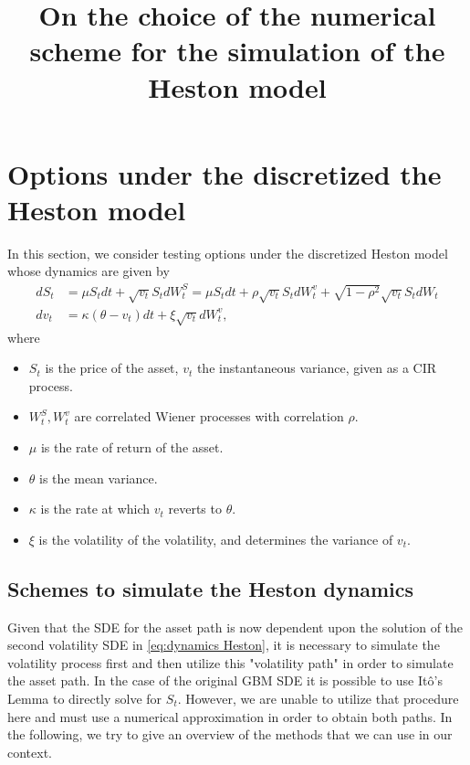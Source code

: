 \documentclass[11pt]{article}
\title{On the choice of the numerical scheme for the simulation of the Heston model}
\date{ }
\newcommand{\COMMA}{,}
\begin{document}
\maketitle






\section{Options under the discretized the Heston model}
In this section, we consider  testing options under the discretized Heston model \cite{heston1993closed,broadie2006exact,kahl2006fast,andersen2007efficient} whose dynamics are given by
\begin{align}\label{eq:dynamics Heston}
dS_t&=\mu S_t dt+\sqrt{v_t}S_t dW_t^S= \mu S_t dt+ \rho\sqrt{v_t}S_t dW_t^v+ \sqrt{1-\rho^2} \sqrt{v_t}S_t dW_t \nonumber\\
dv_t&=\kappa (\theta-v_t)dt+\xi \sqrt{v_t} dW_t^v\COMMA
\end{align}
where 

\begin{itemize}
\item $S_t$ is the price of the asset, $v_t$ the instantaneous variance, given as  a CIR process.
\item $W_{t}^{S},W_{t}^{v}$ are correlated Wiener processes with correlation $\rho$.
\item $\mu$  is the rate of return of the asset.
\item $\theta$ is  the mean  variance.
\item $\kappa$ is the rate at which $v_t$ reverts to $\theta$.
\item $\xi$ is the volatility of the volatility, and determines the variance of $v_t$.
\end{itemize}
\subsection{Schemes to simulate the Heston dynamics}

Given that the SDE for the asset path is now dependent  upon the solution of the second volatility SDE in \eqref{eq:dynamics Heston}, it is necessary to simulate the volatility process first and then utilize this "volatility path" in order to simulate the asset path. In the case of the original GBM SDE it is possible to use It\^o's Lemma to directly solve for $S_t$. However, we are unable to utilize that procedure here and must use a numerical approximation in order to obtain both paths. In the following, we try to give an overview of the methods that we can use in our context.
\end{document}
